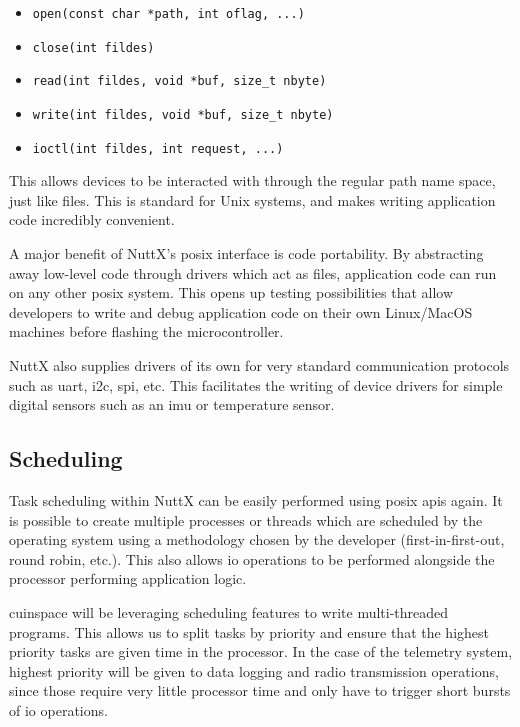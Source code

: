 \begin{itemize}
    \item \texttt{open(const char *path, int oflag, ...)}
    \item \texttt{close(int fildes)}
    \item \texttt{read(int fildes, void *buf, size\_t nbyte)}
    \item \texttt{write(int fildes, void *buf, size\_t nbyte)}
    \item \texttt{ioctl(int fildes, int request, ...)}
\end{itemize}

This allows devices to be interacted with through the regular path name space, just like files. This is standard for
Unix systems, and makes writing application code incredibly convenient.

A major benefit of NuttX's \gls{posix} interface is code portability. By abstracting away low-level code through
drivers which act as files, application code can run on any other \gls{posix} system. This opens up testing
possibilities that allow developers to write and debug application code on their own Linux/MacOS machines before
flashing the microcontroller.

NuttX also supplies drivers of its own for very standard communication protocols such as \gls{uart}, \gls{i2c},
\gls{spi}, etc. This facilitates the writing of device drivers for simple digital sensors such as an \gls{imu} or
temperature sensor.

\subsection{Scheduling}

Task scheduling within NuttX can be easily performed using \gls{posix} \glspl{api} again. It is possible to create
multiple processes or threads which are scheduled by the operating system using a methodology chosen by the developer
(first-in-first-out, round robin, etc.). This also allows \gls{io} operations to be performed alongside the processor
performing application logic.

\Gls{cuinspace} will be leveraging scheduling features to write multi-threaded programs. This allows us to split tasks
by priority and ensure that the highest priority tasks are given time in the processor. In the case of the telemetry
system, highest priority will be given to data logging and radio transmission operations, since those require very
little processor time and only have to trigger short bursts of \gls{io} operations.

